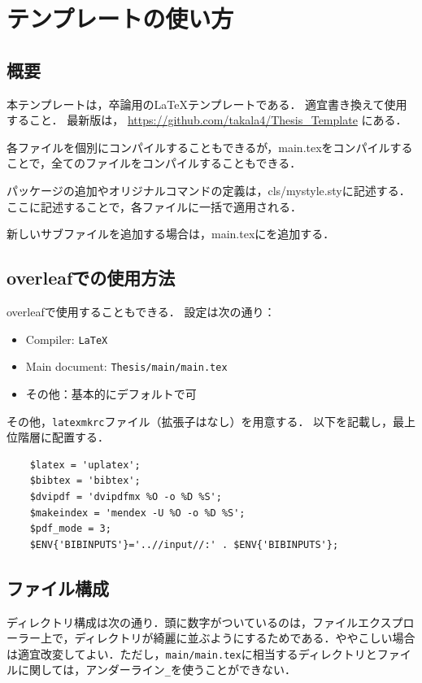 \documentclass[../main/main]{subfiles}
\begin{document}
\chapter{テンプレートの使い方}
\section{概要}
本テンプレートは，卒論用の\LaTeX テンプレートである．
適宜書き換えて使用すること．
最新版は，
\url{https://github.com/takala4/Thesis_Template}
にある．
\par
各ファイルを個別にコンパイルすることもできるが，main.texをコンパイルすることで，全てのファイルをコンパイルすることもできる．
\par
パッケージの追加やオリジナルコマンドの定義は，cls/mystyle.styに記述する．
ここに記述することで，各ファイルに一括で適用される．
\par
新しいサブファイルを追加する場合は，main.texに\verb||を追加する．


\section{overleafでの使用方法}\label{sec:1_overleaf}
overleafで使用することもできる．
設定は次の通り：
\begin{itemize}
  \item Compiler: \verb|LaTeX|
  \item Main document: \verb|Thesis/main/main.tex|
  \item その他：基本的にデフォルトで可
\end{itemize}
その他，\verb|latexmkrc|ファイル（拡張子はなし）を用意する．
以下を記載し，最上位階層に配置する．
\begin{lstlisting}
    $latex = 'uplatex';
    $bibtex = 'bibtex';
    $dvipdf = 'dvipdfmx %O -o %D %S';
    $makeindex = 'mendex -U %O -o %D %S';
    $pdf_mode = 3;
    $ENV{'BIBINPUTS'}='..//input//:' . $ENV{'BIBINPUTS'};
\end{lstlisting}


\newpage
\section{ファイル構成}
ディレクトリ構成は次の通り．頭に数字がついているのは，ファイルエクスプローラー上で，ディレクトリが綺麗に並ぶようにするためである．ややこしい場合は適宜改変してよい．ただし，\verb|main/main.tex|に相当するディレクトリとファイルに関しては，アンダーライン\verb|_|を使うことができない．
\begin{framed}
\end{framed}
\end{document}
